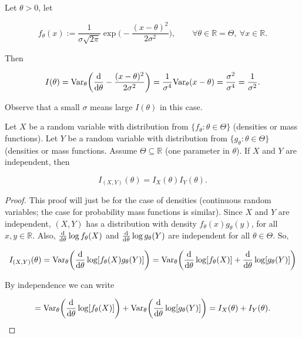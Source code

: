 \begin{example} Let \(\theta > 0\), let 

\[
f_\theta(x) := \frac{1}{\sigma \sqrt{2 \pi}} \exp\bigg( - \frac{(x-\theta)^2}{2 \sigma^2} \bigg), \qquad \forall \theta \in \mathbb{R} = \Theta, \ \forall x \in \mathbb{R}.
\]

Then

\[
I(\theta) = \Var_\theta \bigg( \deriv{}{\theta} - \frac{(x- \theta)^2}{2 \sigma^2} \bigg) = \frac{1}{\sigma^4} \Var_\theta(x-\theta) = \frac{\sigma^2}{\sigma^4} = \frac{1}{\sigma^2}.
\]

Observe that a small \(\sigma\) means large \(I(\theta)\) in this case.

\end{example}

\begin{proposition}\label{mathstats.541.prop.6.21} Let \(X\) be a random variable with distribution from \(\{f_\theta: \theta \in \Theta\}\) (densities or mass functions). Let \(Y\) be a random variable with distribution from \(\{g_\theta: \theta \in \Theta\}\) (densities or mass functions. Assume \(\Theta \subseteq \mathbb{R}\) (one parameter in \(\theta\)). If \(X\) and \(Y\) are independent, then

\[
I_{(X,Y)}(\theta) = I_X(\theta) I_Y(\theta).
\]

\end{proposition}



\begin{proof} This proof will just be for the case of densities (continuous random variables; the case for probability mass functions is similar). Since \(X\) and \(Y\) are independent, \((X,Y)\) has a distribution with density \(f_\theta(x) g_\theta(y)\), for all \(x, y \in \mathbb{R}\). Also, \(\deriv{}{\theta} \log f_\theta(X)\) and \(\deriv{}{\theta} \log g_\theta(Y)\) are independent for all \(\theta \in \Theta\). So,

\[
I_{(X,Y)}(\theta) = \Var_\theta \bigg( \deriv{}{\theta} \log [f_\theta(X) g_\theta(Y)] \bigg)  = \Var_\theta \bigg( \deriv{}{\theta} \log [f_\theta(X) ] +  \deriv{}{\theta}  \log[ g_\theta(Y)] \bigg)  
\]

By independence we can write

\[
 = \Var_\theta \bigg( \deriv{}{\theta} \log [f_\theta(X) ] \bigg) +  \Var_\theta \bigg( \deriv{}{\theta}  \log[ g_\theta(Y)] \bigg)  = I_X(\theta) + I_Y(\theta).
 \]

\end{proof}

